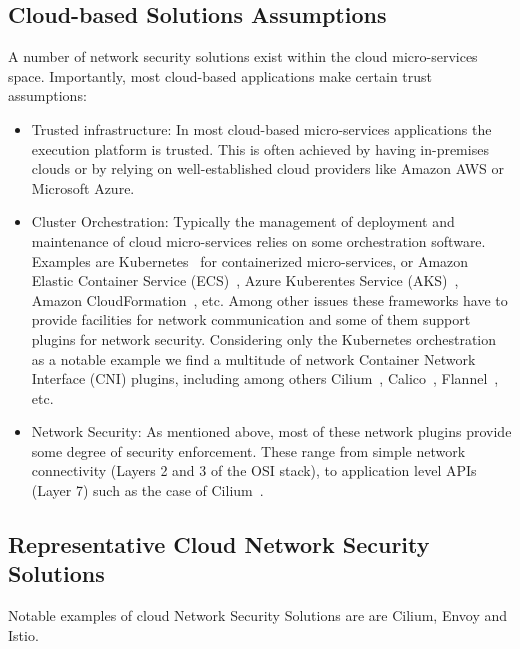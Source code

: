 \documentclass[a4paper%
]{article}
\begin{document}
\subsection{Cloud-based Solutions Assumptions}
\label{sec:cloud-sol}

A number of network security solutions exist within the cloud
micro-services space.
%
Importantly, most cloud-based applications make certain trust
assumptions:
\begin{itemize}
\item {\sc Trusted infrastructure:}
  In most cloud-based micro-services applications the execution
  platform is trusted.
  This is often achieved by having in-premises clouds or by relying on
  well-established cloud providers like Amazon AWS or Microsoft Azure.
\item {\sc Cluster Orchestration:}
  Typically the management of deployment and maintenance of cloud
  micro-services relies on some orchestration software.
  Examples are Kubernetes~\cite{kubernetes} for containerized
  micro-services, or Amazon Elastic Container Service
  (ECS)~\cite{aws-ecs}, Azure Kuberentes Service
  (AKS)~\cite{azure-aks}, Amazon
  CloudFormation~\cite{aws-cloudformation}, etc.
  Among other issues these frameworks have to provide facilities for
  network communication and some of them support plugins for network
  security.
  Considering only the Kubernetes orchestration as a notable example
  we find a multitude of network Container Network Interface (CNI)
  plugins, including among others Cilium~\cite{cilium},
  Calico~\cite{calico}, Flannel~\cite{flannel}, etc. 
\item {\sc Network Security:}
  As mentioned above, most of these network plugins provide some
  degree of security enforcement.
  These range from simple network connectivity (Layers 2 and 3 of the
  OSI stack), to application level APIs (Layer 7) such as the case of
  Cilium~\cite{cilium}. 
\end{itemize}

\subsection{Representative Cloud Network Security Solutions}
\label{sec:repr-cloud-netw}

Notable examples of cloud Network Security Solutions are  are Cilium,
Envoy and Istio.
\end{document}
